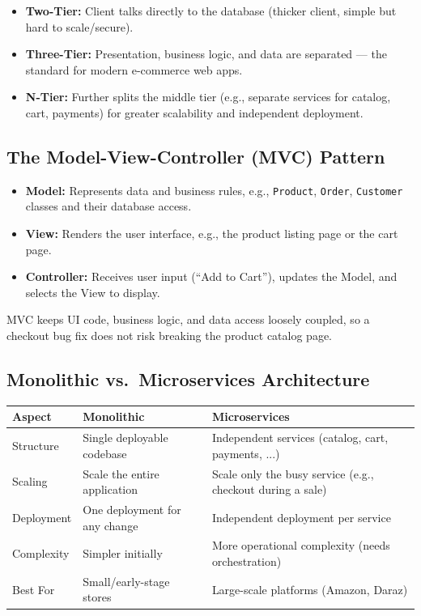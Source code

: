 \documentclass[11pt,a4paper]{article}
\begin{document}
\begin{itemize}[leftmargin=*]
  \item \textbf{Two-Tier:} Client talks directly to the database (thicker client, simple but hard to scale/secure).
  \item \textbf{Three-Tier:} Presentation, business logic, and data are separated --- the standard for modern e-commerce web apps.
  \item \textbf{N-Tier:} Further splits the middle tier (e.g., separate services for catalog, cart, payments) for greater scalability and independent deployment.
\end{itemize}

\subsection{The Model-View-Controller (MVC) Pattern}
\begin{conceptbox}
\begin{itemize}[leftmargin=*]
  \item \textbf{Model:} Represents data and business rules, e.g., \texttt{Product}, \texttt{Order}, \texttt{Customer} classes and their database access.
  \item \textbf{View:} Renders the user interface, e.g., the product listing page or the cart page.
  \item \textbf{Controller:} Receives user input (``Add to Cart''), updates the Model, and selects the View to display.
\end{itemize}
MVC keeps UI code, business logic, and data access loosely coupled, so a checkout bug fix does not risk breaking the product catalog page.
\end{conceptbox}

\subsection{Monolithic vs.\ Microservices Architecture}
\begin{center}
\begin{tabular}{@{}p{2.6cm}p{5.2cm}p{5.2cm}@{}}
\toprule
\rowcolor{primary!15}
\textbf{Aspect} & \textbf{Monolithic} & \textbf{Microservices} \\
\midrule
Structure & Single deployable codebase & Independent services (catalog, cart, payments, ...) \\
Scaling & Scale the entire application & Scale only the busy service (e.g., checkout during a sale) \\
Deployment & One deployment for any change & Independent deployment per service \\
Complexity & Simpler initially & More operational complexity (needs orchestration) \\
Best For & Small/early-stage stores & Large-scale platforms (Amazon, Daraz) \\
\bottomrule
\end{tabular}
\end{center}
\end{document}
